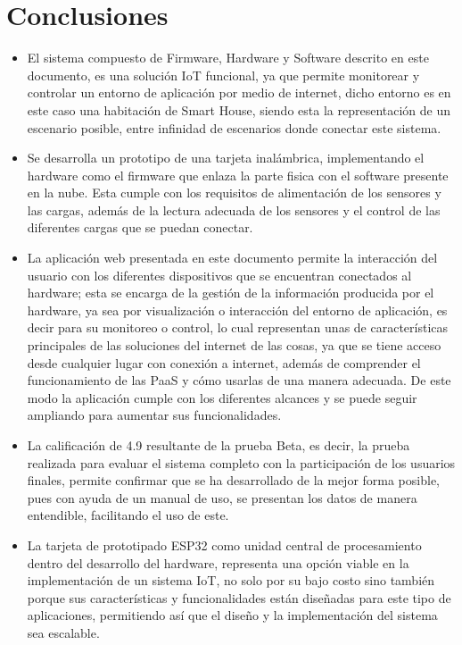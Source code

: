 \chapter{Conclusiones}

\begin{itemize}
	\item El sistema compuesto de Firmware, Hardware y Software descrito en este documento, es una solución IoT funcional, ya que permite monitorear y controlar un entorno de aplicación por medio de internet, dicho entorno es en este caso una habitación de Smart House, siendo esta la representación de un escenario posible, entre infinidad de escenarios donde conectar este sistema.
	
	\item Se desarrolla un prototipo de una tarjeta inalámbrica, implementando el hardware como el firmware que enlaza la parte fisica con el software presente en la nube. Esta cumple con los requisitos de alimentación de los sensores y las cargas, además de la lectura adecuada de los sensores y el control de las diferentes cargas que se puedan conectar.
	
	\item La aplicación web presentada en este documento permite la interacción del usuario con los diferentes dispositivos que se encuentran conectados al hardware; esta se encarga de la gestión de la información producida por el hardware, ya sea por visualización o interacción del entorno de aplicación, es decir para su monitoreo o control, lo cual representan unas de características principales de las soluciones del internet de las cosas, ya que se tiene acceso desde cualquier lugar con conexión a internet, además de comprender el funcionamiento de las PaaS y cómo usarlas de una manera adecuada. De este modo la aplicación cumple con los diferentes alcances y se puede seguir ampliando para aumentar sus funcionalidades.
	
	\item La calificación de 4.9 resultante de la prueba Beta, es decir, la prueba realizada para evaluar el sistema completo con la participación de los usuarios finales, permite confirmar que se ha desarrollado de la mejor forma posible, pues con ayuda de un manual de uso, se presentan los datos de manera entendible, facilitando el uso de este.
		
	\item La tarjeta de prototipado ESP32 como unidad central de procesamiento dentro del desarrollo del hardware, representa una opción viable en la implementación de un sistema IoT, no solo por su bajo costo sino también porque sus características y funcionalidades están diseñadas para este tipo de aplicaciones, permitiendo así que el diseño y la implementación del sistema sea escalable.
	

\end{itemize}
